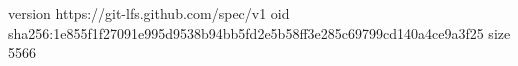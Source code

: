 version https://git-lfs.github.com/spec/v1
oid sha256:1e855f1f27091e995d9538b94bb5fd2e5b58ff3e285c69799cd140a4ce9a3f25
size 5566
